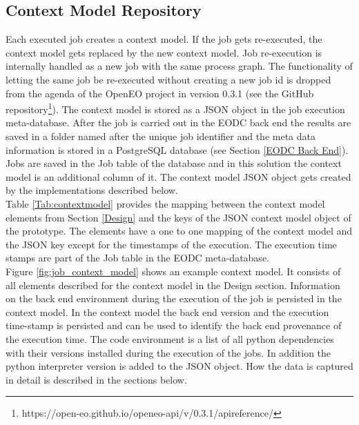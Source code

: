 \documentclass[draft,final]{vutinfth} %
\begin{document}
\subsection{Context Model Repository}\label{Implementation:Provenance Repository}
Each executed job creates a context model. If the job gets re-executed, the context model gets replaced by the new context model. Job re-execution is internally handled as a new job with the same process graph. The functionality of letting the same job be re-executed without creating a new job id is dropped from the agenda of the OpenEO project in version 0.3.1 (see the GitHub repository\footnote{https://open-eo.github.io/openeo-api/v/0.3.1/apireference/}). 
The context model is stored as a JSON object in the job execution meta-database. After the job is carried out in the EODC back end the results are saved in a folder named after the unique job identifier and the meta data information is stored in a PostgreSQL database (see Section \ref{EODC Back End}). Jobs are saved in the Job table of the database and in this solution the context model is an additional column of it. The context model JSON object gets created by the implementations described below. \\
Table \ref{Tab:contextmodel} provides the mapping between the context model elements from Section \ref{Design} and the keys of the JSON context model object of the prototype. The elements have a one to one mapping of the context model and the JSON key except for the timestamps of the execution. The execution time stamps are part of the Job table in the EODC meta-database. \\
Figure \ref{fig:job_context_model} shows an example context model. It consists of all elements described for the context model in the Design section. Information on the back end environment during the execution of the job is persisted in the context model. In the context model the back end version and the execution time-stamp is persisted and can be used to identify the back end provenance of the execution time. The code environment is a list of all python dependencies with their versions installed during the execution of the jobs. In addition the python interpreter version is added to the JSON object. How the data is captured in detail is described in the sections below.    

 
\end{document}
